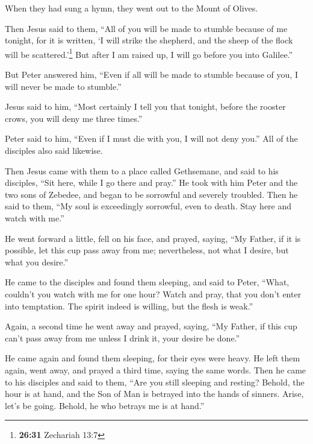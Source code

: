  When they had sung a hymn, they went out to the Mount of
Olives.

 Then Jesus said to them, ``All of you will be made to
stumble because of me tonight, for it is written, `I will strike the
shepherd, and the sheep of the flock will be scattered.'\footnote{\textbf{26:31}
  Zechariah 13:7}  But after I am raised up, I will go
before you into Galilee.''

 But Peter answered him, ``Even if all will be made to
stumble because of you, I will never be made to stumble.''

 Jesus said to him, ``Most certainly I tell you that
tonight, before the rooster crows, you will deny me three times.''

 Peter said to him, ``Even if I must die with you, I will
not deny you.'' All of the disciples also said likewise.

 Then Jesus came with them to a place called Gethsemane,
and said to his disciples, ``Sit here, while I go there and pray.''
 He took with him Peter and the two sons of Zebedee, and
began to be sorrowful and severely troubled.  Then he
said to them, ``My soul is exceedingly sorrowful, even to death. Stay
here and watch with me.''

 He went forward a little, fell on his face, and prayed,
saying, ``My Father, if it is possible, let this cup pass away from me;
nevertheless, not what I desire, but what you desire.''

 He came to the disciples and found them sleeping, and
said to Peter, ``What, couldn't you watch with me for one hour?
 Watch and pray, that you don't enter into temptation.
The spirit indeed is willing, but the flesh is weak.''

 Again, a second time he went away and prayed, saying,
``My Father, if this cup can't pass away from me unless I drink it, your
desire be done.''

 He came again and found them sleeping, for their eyes
were heavy.  He left them again, went away, and prayed a
third time, saying the same words.  Then he came to his
disciples and said to them, ``Are you still sleeping and resting?
Behold, the hour is at hand, and the Son of Man is betrayed into the
hands of sinners.  Arise, let's be going. Behold, he who
betrays me is at hand.''

